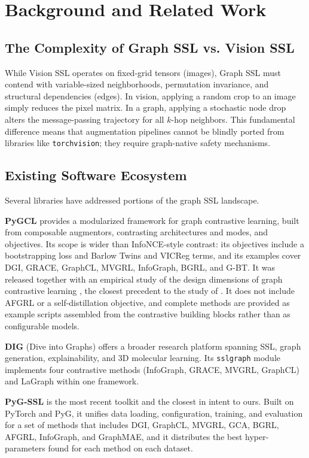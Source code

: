 \documentclass[conference]{IEEEtran}
\begin{document}
\section{Background and Related Work}

\subsection{The Complexity of Graph SSL vs. Vision SSL}
While Vision SSL operates on fixed-grid tensors (images), Graph SSL must contend with variable-sized neighborhoods, permutation invariance, and structural dependencies (edges). In vision, applying a random crop to an image simply reduces the pixel matrix. In a graph, applying a stochastic node drop alters the message-passing trajectory for all $k$-hop neighbors. This fundamental difference means that augmentation pipelines cannot be blindly ported from libraries like \texttt{torchvision}; they require graph-native safety mechanisms.

\subsection{Existing Software Ecosystem}
Several libraries have addressed portions of the graph SSL landscape.

\textbf{PyGCL} \cite{pygcl} provides a modularized framework for graph contrastive learning, built from composable augmentors, contrasting architectures and modes, and objectives. Its scope is wider than InfoNCE-style contrast: its objectives include a bootstrapping loss and Barlow Twins and VICReg terms, and its examples cover DGI, GRACE, GraphCL, MVGRL, InfoGraph, BGRL, and G-BT. It was released together with an empirical study of the design dimensions of graph contrastive learning \cite{pygcl}, the closest precedent to the study of . It does not include AFGRL or a self-distillation objective, and complete methods are provided as example scripts assembled from the contrastive building blocks rather than as configurable models.

\textbf{DIG} (Dive into Graphs) \cite{dig} offers a broader research platform spanning SSL, graph generation, explainability, and 3D molecular learning. Its \texttt{sslgraph} module implements four contrastive methods (InfoGraph, GRACE, MVGRL, GraphCL) and LaGraph within one framework.

\textbf{PyG-SSL} \cite{pygssl} is the most recent toolkit and the closest in intent to ours. Built on PyTorch and PyG, it unifies data loading, configuration, training, and evaluation for a set of methods that includes DGI, GraphCL, MVGRL, GCA, BGRL, AFGRL, InfoGraph, and GraphMAE, and it distributes the best hyper-parameters found for each method on each dataset.
\end{document}
